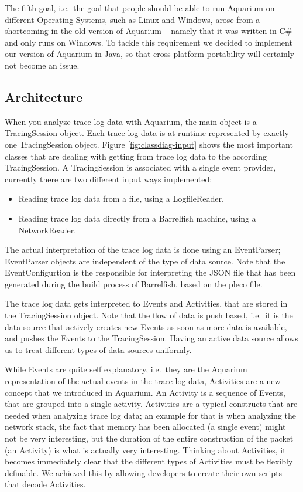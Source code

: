 \documentclass[a4paper,11pt,twoside]{report}
\begin{document}
The fifth goal, i.e.~the goal that people should be able to run Aquarium on
different Operating Systems, such as Linux and Windows, arose from a shortcoming
in the old version of Aquarium -- namely that it was written in C\# and only
runs on Windows. To tackle this requirement we decided to implement our version
of Aquarium in Java, so that cross platform portability will certainly not
become an issue.

\subsection{Architecture\label{sec:aquarium-architecture}}

When you analyze trace log data with Aquarium, the main object is a
TracingSession object. Each trace log data is at runtime represented by exactly
one TracingSession object. Figure \ref{fig:classdiag-input} shows the most
important classes that are dealing with getting from trace log data to the
according TracingSession. A TracingSession is associated with a single event
provider, currently there are two different input ways implemented:

\begin{itemize}
	\item Reading trace log data from a file, using a LogfileReader.
	\item Reading trace log data directly from a Barrelfish machine, using a
		NetworkReader.
\end{itemize}

The actual interpretation of the trace log data is done using an EventParser;
EventParser objects are independent of the type of data source. Note that the
EventConfigurtion is the responsible for interpreting the JSON file that has
been generated during the build process of Barrelfish, based on the pleco file.

The trace log data gets interpreted to Events and Activities, that are stored in
the TracingSession object. Note that the flow of data is push based, i.e.~it is
the data source that actively creates new Events as soon as more data is
available, and pushes the Events to the TracingSession. Having an active data
source allows us to treat different types of data sources uniformly.

While Events are quite self explanatory, i.e.~they are the Aquarium
representation of the actual events in the trace log data, Activities are a new
concept that we introduced in Aquarium. An Activity is a sequence of Events,
that are grouped into a single activity. Activities are a typical constructs
that are needed when analyzing trace log data; an example for that is when
analyzing the network stack, the fact that memory has been allocated (a single
event) might not be very interesting, but the duration of the entire
construction of the packet (an Activity) is what is actually very interesting.
Thinking about Activities, it becomes immediately clear that the different types
of Activities must be flexibly definable. We achieved this by allowing
developers to create their own scripts that decode Activities. 
\end{document}
